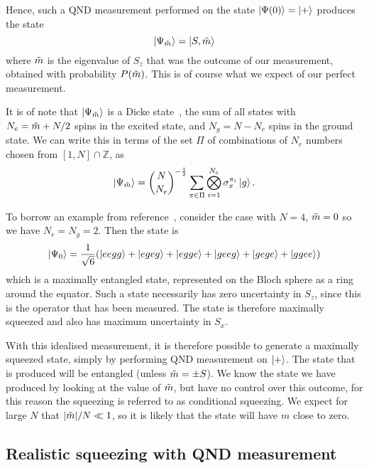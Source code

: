 Hence, such a QND measurement performed on the state $\ket{\Psi(0)} =
\ket{+}$ produces the state
%
\begin{equation}
  \ket{\Psi_{\tilde{m}}} = \ket{S, \tilde{m}}
\end{equation}
%
where $\tilde{m}$ is the eigenvalue of $S_z$ that was the outcome of our
measurement, obtained with probability $P(\tilde{m})$. This is of course what we
expect of our perfect measurement.

It is of note that $\ket{\Psi_{\tilde{m}}}$ is a Dicke
state~\cite{Baertschi2019}, the sum of all states with $N_e = \tilde{m} + N/2$
spins in the excited state, and $N_g = N - N_e$ spins in the ground state.  We
can write this in terms of the set $\Pi$ of combinations of $N_e$ numbers
chosen from $[1,N]\cap\mathbb{Z}$, as
%
\begin{equation}
  \ket{\Psi_{\tilde{m}}} = \binom{N}{N_e}^{-\frac{1}{2}}\sum_{\pi \in \Pi}
  \bigotimes_{i=1}^{N_e} \sigma_x^{\pi_i} \ket{g}.
\end{equation}

To borrow an example from reference~\cite{Cox2016}, consider the case with
$N=4$, $\tilde{m}=0$ so we have $N_e = N_g = 2$. Then the state is
%
\begin{equation}
  \ket{\Psi_0} = \frac{1}{\sqrt{6}}(\ket{eegg} + \ket{egeg} + \ket{egge} +
  \ket{geeg} + \ket{gege} + \ket{ggee})
\end{equation}
%
which is a maximally entangled state, represented on the Bloch sphere as a ring
around the equator.
%
Such a state necessarily has zero uncertainty in $S_z$, since this is the
operator that has been measured. The state is therefore maximally squeezed and also
has maximum uncertainty in $S_x$.

With this idealised measurement, it is therefore possible to generate a maximally
squeezed state, simply by performing QND measurement on $\ket{+}$. The state
that is produced will be entangled (unless $\tilde{m} = \pm S$). We know the
state we have produced by looking at the value of $\tilde{m}$, but have no
control over this outcome, for this reason the squeezing is referred to as
conditional squeezing.
%
We expect for large $N$ that $|\tilde{m}|/N \ll 1$, so it is likely that the
state will have $m$ close to zero.

\subsection{Realistic squeezing with QND measurement}


